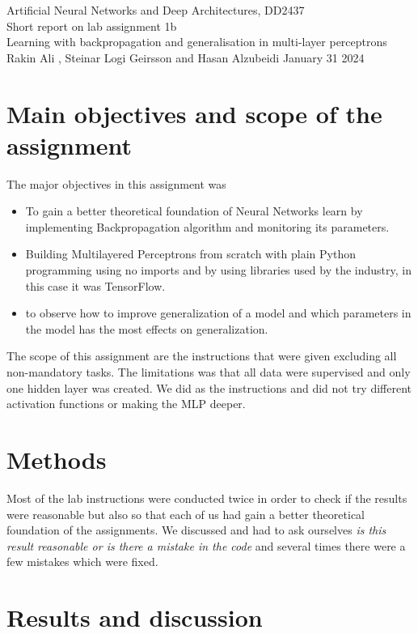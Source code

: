 \documentclass[a4paper]{article}
\begin{document}
\begin{center}
  {\large Artificial Neural Networks and Deep Architectures, DD2437}\\
  \vspace{7mm}
  {\huge Short report on lab assignment 1b\\[1ex]}
  {\Large Learning with backpropagation and generalisation in multi-layer perceptrons\\}
  \vspace{8mm}  
  {\Large Rakin Ali , Steinar Logi Geirsson and Hasan Alzubeidi}
  \vspace{4mm}
  {\large January 31 2024 }
\end{center}

\section{Main objectives and scope of the assignment}
The major objectives in this assignment was
\begin{itemize}
\item To gain a better theoretical foundation of Neural Networks learn by implementing Backpropagation algorithm and monitoring its parameters. 
\item Building Multilayered Perceptrons from scratch with plain Python programming using no imports and by using libraries used by the industry, in this case it was TensorFlow.
\item to observe how to improve generalization of a model and which parameters in the model has the most effects on generalization. 
\end{itemize}
The scope of this assignment are the instructions that were given excluding all non-mandatory tasks. The limitations was that all data were supervised and only one hidden layer was created. We did as the instructions and did not try different activation functions or making the MLP deeper. 
\section{Methods}
Most of the lab instructions were conducted twice in order to check if the results were reasonable but also so that each of us had gain a better theoretical foundation of the assignments. We discussed and had to ask ourselves \textit{is this result reasonable or is there a mistake in the code} and several times there were a few mistakes which were fixed. 


\section{Results and discussion}
\end{document}
